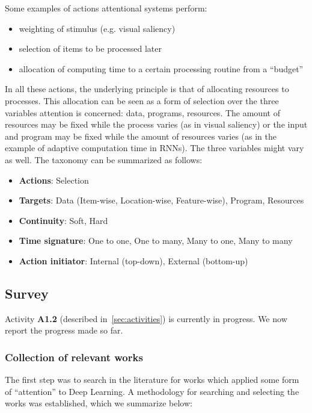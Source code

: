 \documentclass[12pt]{article}
\begin{document}
Some examples of actions attentional systems perform:
\begin{itemize}
    \item weighting of stimulus (e.g. visual saliency)
    \item selection of items to be processed later
    \item allocation of computing time to a certain processing routine from a “budget”
\end{itemize}

In all these actions, the underlying principle is that of allocating resources to processes.
This allocation can be seen as a form of selection over the three variables attention is concerned: data, programs, resources.
The amount of resources may be fixed while the process varies (as in visual saliency) or the input and program may be fixed
while the amount of resources varies (as in the example of adaptive computation time in RNNs).
The three variables might vary as well.
The taxonomy can be summarized as follows:

\begin{itemize}
    \item \textbf{Actions}: Selection
    \item \textbf{Targets}: Data (Item-wise, Location-wise, Feature-wise),
        Program, Resources
    \item \textbf{Continuity}: Soft, Hard
    \item \textbf{Time signature}: One to one, One to many, Many to one,
        Many to many
    \item \textbf{Action initiator}: Internal (top-down), External (bottom-up)
\end{itemize}

\subsection{Survey}
Activity \textbf{A1.2} (described in~\ref{sec:activities}) is currently in progress.
We now report the progress made so far.

\subsubsection{Collection of relevant works}
The first step was to search in the literature for works which applied some form
of ``attention'' to Deep Learning.
A methodology for searching and selecting the works was established,
which we summarize below:
\end{document}
